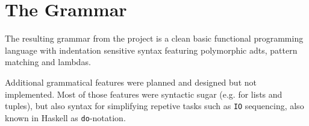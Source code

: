 \section{The Grammar}


The resulting grammar from the project is a clean basic functional programming language with indentation sensitive syntax featuring polymorphic \glspl{adt}, pattern matching and lambdas.

Additional grammatical features %
were planned and designed but not implemented. Most of those features were syntactic sugar (e.g. for lists and tuples), but also syntax for simplifying repetive tasks such as \texttt{IO} sequencing, also known in Haskell as \texttt{do}-notation. 